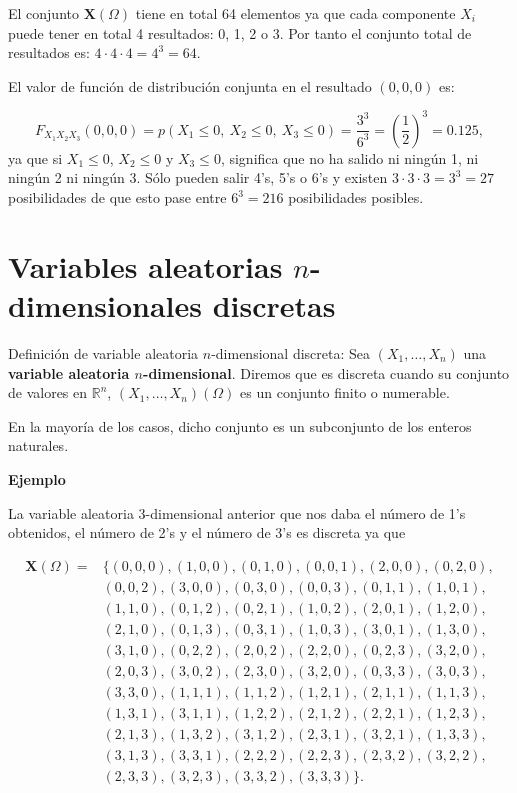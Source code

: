 \documentclass[
  letterpaper,
  DIV=11,
  numbers=noendperiod]{scrreprt}
\begin{document}
El conjunto \(\mathbf{X}(\Omega)\) tiene en total 64 elementos ya que
cada componente \(X_i\) puede tener en total 4 resultados: 0, 1, 2 o 3.
Por tanto el conjunto total de resultados es:
\(4\cdot 4\cdot 4=4^3=64\).

El valor de función de distribución conjunta en el resultado \((0,0,0)\)
es:

\[
F_{X_1X_2X_3}(0,0,0)=p(X_1\leq 0,\ X_2\leq 0,\ X_3\leq 0)=\frac{3^3}{6^3}=\left(\frac{1}{2}\right)^3 =0.125,
\] ya que si \(X_1\leq 0\), \(X_2\leq 0\) y \(X_3\leq 0\), significa que
no ha salido ni ningún 1, ni ningún 2 ni ningún 3. Sólo pueden salir
4's, 5's o 6's y existen \(3\cdot 3\cdot 3=3^3=27\) posibilidades de que
esto pase entre \(6^3=216\) posibilidades posibles.

\hypertarget{variables-aleatorias-n-dimensionales-discretas}{%
\section{\texorpdfstring{Variables aleatorias \(n\)-dimensionales
discretas}{Variables aleatorias n-dimensionales discretas}}\label{variables-aleatorias-n-dimensionales-discretas}}

Definición de variable aleatoria \(n\)-dimensional discreta: Sea
\((X_1,\ldots,X_n)\) una \textbf{variable aleatoria \(n\)-dimensional}.
Diremos que es discreta cuando su conjunto de valores en
\(\mathbb{R}^n\), \((X_1,\ldots,X_n)(\Omega)\) es un conjunto finito o
numerable.

En la mayoría de los casos, dicho conjunto es un subconjunto de los
enteros naturales.

\textbf{Ejemplo}

La variable aleatoria 3-dimensional anterior que nos daba el número de
1's obtenidos, el número de 2's y el número de 3's es discreta ya que

\[
\begin{array}{rl}
\mathbf{X}(\Omega) =& \{
  (0,0,0),(1,0,0),(0,1,0),(0,0,1),(2,0,0),(0,2,0),\\
& (0,0,2),(3,0,0),(0,3,0),(0,0,3),(0,1,1),(1,0,1),\\
&  (1,1,0),(0,1,2),(0,2,1),(1,0,2),(2,0,1),(1,2,0),\\
&  (2,1,0),(0,1,3),(0,3,1),(1,0,3),(3,0,1),(1,3,0),\\
&  (3,1,0),(0,2,2),(2,0,2),(2,2,0),(0,2,3),(3,2,0),\\
&  (2,0,3),(3,0,2),(2,3,0),(3,2,0),(0,3,3),(3,0,3),\\
&  (3,3,0),(1,1,1),(1,1,2),(1,2,1),(2,1,1),(1,1,3),\\
& (1,3,1),(3,1,1),(1,2,2),(2,1,2),(2,2,1),(1,2,3),\\
& (2,1,3),(1,3,2),(3,1,2),(2,3,1),(3,2,1),(1,3,3),\\
& (3,1,3),(3,3,1),(2,2,2),(2,2,3),(2,3,2),(3,2,2),\\
& (2,3,3),(3,2,3),(3,3,2),(3,3,3)\}.
\end{array}
\]
\end{document}
